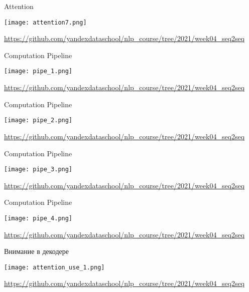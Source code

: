 \documentclass[notes,12pt, aspectratio=169]{beamer}
\begin{document}
\begin{frame}{Attention}
	\begin{center}
		\texttt{[image: attention7.png]}
	\end{center}
	\vfill
	\footnotesize  {\color{blue} \url{https://github.com/yandexdataschool/nlp_course/tree/2021/week04_seq2seq}} 
\end{frame} 



\begin{frame}{Computation Pipeline}
	\begin{center}
		\texttt{[image: pipe\_1.png]}
	\end{center}
	\vfill
	\footnotesize  {\color{blue} \url{https://github.com/yandexdataschool/nlp_course/tree/2021/week04_seq2seq}} 
\end{frame} 

\begin{frame}{Computation Pipeline}
	\begin{center}
		\texttt{[image: pipe\_2.png]}
	\end{center}
	\vfill
	\footnotesize  {\color{blue} \url{https://github.com/yandexdataschool/nlp_course/tree/2021/week04_seq2seq}} 
\end{frame} 

\begin{frame}{Computation Pipeline}
	\begin{center}
		\texttt{[image: pipe\_3.png]}
	\end{center}
	\vfill
	\footnotesize  {\color{blue} \url{https://github.com/yandexdataschool/nlp_course/tree/2021/week04_seq2seq}} 
\end{frame} 

\begin{frame}{Computation Pipeline}
	\begin{center}
		\texttt{[image: pipe\_4.png]}
	\end{center}
	\vfill
	\footnotesize  {\color{blue} \url{https://github.com/yandexdataschool/nlp_course/tree/2021/week04_seq2seq}} 
\end{frame} 




\begin{frame}{Внимание в декодере}
	\begin{center}
		\texttt{[image: attention\_use\_1.png]}
	\end{center}
	\vfill
	\footnotesize  {\color{blue} \url{https://github.com/yandexdataschool/nlp_course/tree/2021/week04_seq2seq}} 
\end{frame} 
\end{document}
